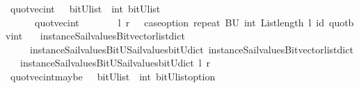 \begin{isabellebody}
{}\isanewline
%
\isanewline
%
\isanewline
{}\isamarkupfalse%
\ quot{\isacharunderscore}vec{\isacharunderscore}int\ \ {\isacharcolon}{\isacharcolon}\ {\isachardoublequoteopen}{\isacharparenleft}bitU{\isacharparenright}list\ {\isasymRightarrow}\ int\ {\isasymRightarrow}{\isacharparenleft}bitU{\isacharparenright}list\ {\isachardoublequoteclose}\ \ \ \isanewline
\ \ \ \ \ {\isachardoublequoteopen}\ quot{\isacharunderscore}vec{\isacharunderscore}int\ \ \ \ \ \ \ \ l\ r\ {\isacharequal}\ {\isacharparenleft}\ case{\isacharunderscore}option\ {\isacharparenleft}repeat\ {\isacharbrackleft}BU{\isacharbrackright}\ {\isacharparenleft}int\ {\isacharparenleft}List{\isachardot}length\ l{\isacharparenright}{\isacharparenright}{\isacharparenright}\ id\ {\isacharparenleft}quot{\isacharunderscore}bv{\isacharunderscore}int\ \isanewline
\ \ {\isacharparenleft}instance{\isacharunderscore}Sail{}{\isacharunderscore}values{\isacharunderscore}Bitvector{\isacharunderscore}list{\isacharunderscore}dict\isanewline
\ \ \ \ \ instance{\isacharunderscore}Sail{}{\isacharunderscore}values{\isacharunderscore}BitU{\isacharunderscore}Sail{}{\isacharunderscore}values{\isacharunderscore}bitU{\isacharunderscore}dict{\isacharparenright}\ {\isacharparenleft}instance{\isacharunderscore}Sail{}{\isacharunderscore}values{\isacharunderscore}Bitvector{\isacharunderscore}list{\isacharunderscore}dict\isanewline
\ \ \ instance{\isacharunderscore}Sail{}{\isacharunderscore}values{\isacharunderscore}BitU{\isacharunderscore}Sail{}{\isacharunderscore}values{\isacharunderscore}bitU{\isacharunderscore}dict{\isacharparenright}\ l\ r{\isacharparenright}{\isacharparenright}{\isachardoublequoteclose}\isanewline
\isanewline
{}\isamarkupfalse%
\ quot{\isacharunderscore}vec{\isacharunderscore}int{\isacharunderscore}maybe\ \ {\isacharcolon}{\isacharcolon}\ {\isachardoublequoteopen}{\isacharparenleft}bitU{\isacharparenright}list\ {\isasymRightarrow}\ int\ {\isasymRightarrow}{\isacharparenleft}{\isacharparenleft}bitU{\isacharparenright}list{\isacharparenright}option\ {\isachardoublequoteclose}\ \ \ \isanewline

\end{isabellebody}
